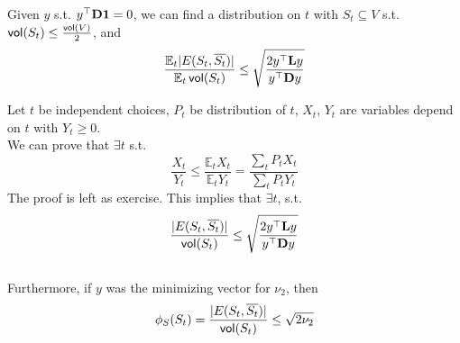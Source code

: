 \documentclass[11pt]{article}
\newcommand\nuReq{y^\top\V{D}\V{1}=0}
\begin{document}
\begin{lemma}
Given $y$ s.t. $\nuReq$, we can find a distribution on $t$ with $S_t \subseteq V$ s.t. $\operatorname{\mathsf{vol}}(S_t) \leq\frac{\operatorname{\mathsf{vol}}(V)}{2}$, and 
$$\frac{\mathbb{E}_t|E(S_t, \overline{S_t})|}{\mathbb{E}_t\vol(S_t)} \leq \sqrt{\frac{2y^\top\V{L}y}{y^\top\V{D}y}}$$
\end{lemma}

Let $t$ be independent choices, $P_t$ be distribution of $t$, $X_t$, $Y_t$ are variables depend on $t$ with $Y_t \geq 0$. \\ 
We can prove that $\exists t$ s.t. 
$$ \frac{X_t}{Y_t} \leq \frac{\mathbb{E}_tX_t}{\mathbb{E}_tY_t} = \frac{\sum_tP_tX_t}{\sum_tP_tY_t}$$
The proof is left as exercise. This implies that $\exists t$, s.t. $$\frac{|E(S_t, \overline{S_t})|}{\vol(S_t)} \leq \sqrt{\frac{2y^\top\V{L}y}{y^\top\V{D}y}}$$ \\ 
Furthermore, if $y$ was the minimizing vector for $\nu_2$, then $$\phi_S(S_t) = \frac{|E(S_t, \overline{S_t})|}{\operatorname{\mathsf{vol}}(S_t)} \leq \sqrt{2\nu_2}$$

\printbibliography
\end{document}
